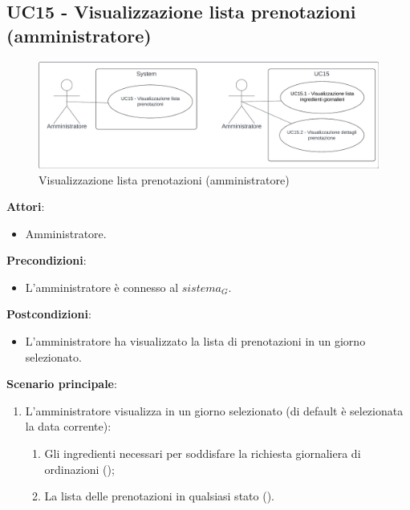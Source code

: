 \subsection{UC15 - Visualizzazione lista prenotazioni (amministratore)} \label{usecase:15}
\begin{figure}[H]
    \centering
    \includegraphics[width=0.9\linewidth]{ucd/ucd15.png}
    \caption{Visualizzazione lista prenotazioni (amministratore)}
\end{figure}
\textbf{Attori}:
\begin{itemize}
    \item Amministratore.
\end{itemize}
\textbf{Precondizioni}:
\begin{itemize}
    \item L'amministratore è connesso al $\textit{sistema}_G$.
\end{itemize}
\textbf{Postcondizioni}:
\begin{itemize}
    \item L'amministratore ha visualizzato la lista di prenotazioni in un giorno selezionato.
\end{itemize}
\textbf{Scenario principale}:
\begin{enumerate}
    \item L'amministratore visualizza in un giorno selezionato (di default è selezionata la data corrente):
    \begin{enumerate}
       \item Gli ingredienti necessari per soddisfare la richiesta giornaliera di ordinazioni ();
       \item La lista delle prenotazioni in qualsiasi stato
       ().
   \end{enumerate}
\end{enumerate}


